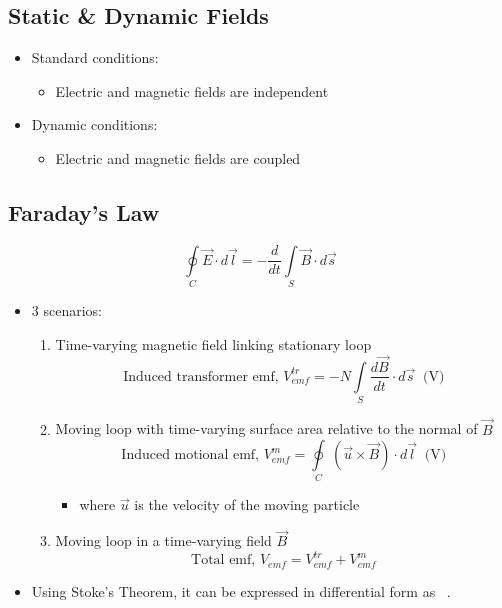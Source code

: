 \documentclass[a4paper]{article}
\begin{document}
\subsection{Static \& Dynamic Fields}
\begin{itemize}
    \item Standard conditions:
    \begin{itemize}[label=$\circ$]
        \item Electric and magnetic fields are independent
    \end{itemize}
    \item Dynamic conditions:
    \begin{itemize}[label=$\circ$]
        \item Electric and magnetic fields are coupled
    \end{itemize}
\end{itemize}

\subsection{Faraday's Law}
$$\oint\limits_C \overrightarrow{E}\cdot d\vec{l} = -\frac{d}{dt}\int\limits_S \overrightarrow{B}\cdot d\vec{s}$$
\begin{itemize}
    \item 3 scenarios:
    \begin{enumerate}
        \item Time-varying magnetic field linking stationary loop
        $$\text{Induced transformer emf, }V_{emf}^{tr} = -N\int\limits_{S}\frac{d\vec{B}}{dt}\cdot d\vec{s}\ \text{ (V)}$$
        \item Moving loop with time-varying surface area relative to the normal of $\overrightarrow{B}$
        $$\text{Induced motional emf, }V_{emf}^{m} = \oint\limits_{C}\ (\overrightarrow{u}\times\overrightarrow{B})\cdot d\vec{l}\ \text{ (V)}$$
        \begin{itemize}[label=$\circ$]
            \item where $\overrightarrow{u}$ is the velocity of the moving particle
        \end{itemize}
        \item Moving loop in a time-varying field $\overrightarrow{B}$
        $$\text{Total emf, }V_{emf} = V_{emf}^{tr}+V_{emf}^{m}$$
    \end{enumerate}
    \item Using Stoke's Theorem, it can be expressed in differential form as \ .
\end{itemize}
\end{document}
